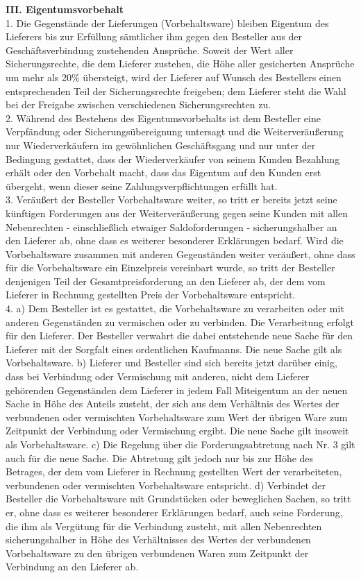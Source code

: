 \begin{multicols}{2}
\begin{scriptsize}
	\textbf{III. Eigentumsvorbehalt}\\
	1. Die Gegenstände der Lieferungen (Vorbehaltsware) bleiben Eigentum des Lieferers bis zur Erfüllung sämtlicher ihm gegen den Besteller aus der Geschäftsverbindung zustehenden Ansprüche. Soweit der Wert aller Sicherungsrechte, die dem Lieferer zustehen, die Höhe aller gesicherten Ansprüche um mehr als 20\% übersteigt, wird der Lieferer auf Wunsch des Bestellers einen entsprechenden Teil der Sicherungsrechte freigeben; dem Lieferer steht die Wahl bei der Freigabe zwischen verschiedenen Sicherungsrechten zu.\\
	2. Während des Bestehens des Eigentumsvorbehalts ist dem Besteller eine Verpfändung oder Sicherungsübereignung untersagt und die Weiterveräußerung nur Wiederverkäufern im gewöhnlichen Geschäftsgang und nur unter der Bedingung gestattet, dass der Wiederverkäufer von seinem Kunden Bezahlung erhält oder den Vorbehalt macht, dass das Eigentum auf den Kunden erst übergeht, wenn dieser seine Zahlungsverpflichtungen erfüllt hat.\\
	3. Veräußert der Besteller Vorbehaltsware weiter, so tritt er bereits jetzt seine künftigen Forderungen aus der Weiterveräußerung gegen seine Kunden mit allen Nebenrechten - einschließlich etwaiger Saldoforderungen - sicherungshalber an den Lieferer ab, ohne dass es weiterer besonderer Erklärungen bedarf. Wird die Vorbehaltsware zusammen mit anderen Gegenständen weiter veräußert, ohne dass für die Vorbehaltsware ein Einzelpreis vereinbart wurde, so tritt der Besteller denjenigen Teil der Gesamtpreisforderung an den Lieferer ab, der dem vom Lieferer in Rechnung gestellten Preis der Vorbehaltsware entspricht.\\
	4. a) Dem Besteller ist es gestattet, die Vorbehaltsware zu verarbeiten oder mit anderen Gegenständen zu vermischen oder zu verbinden. Die Verarbeitung erfolgt für den Lieferer. Der Besteller verwahrt die dabei entstehende neue Sache für den Lieferer mit der Sorgfalt eines ordentlichen Kaufmanns. Die neue Sache gilt als Vorbehaltsware. b) Lieferer und Besteller sind sich bereits jetzt darüber einig, dass bei Verbindung oder Vermischung mit anderen, nicht dem Lieferer gehörenden Gegenständen dem Lieferer in jedem Fall Miteigentum an der neuen Sache in Höhe des Anteils zusteht, der sich aus dem Verhältnis des Wertes der verbundenen oder vermischten Vorbehaltsware zum Wert der übrigen Ware zum Zeitpunkt der Verbindung oder Vermischung ergibt. Die neue Sache gilt insoweit als Vorbehaltsware. c) Die Regelung über die Forderungsabtretung nach Nr. 3 gilt auch für die neue Sache. Die Abtretung gilt jedoch nur bis zur Höhe des Betrages, der dem vom Lieferer in Rechnung gestellten Wert der verarbeiteten, verbundenen oder vermischten Vorbehaltsware entspricht. d) Verbindet der Besteller die Vorbehaltsware mit Grundstücken oder beweglichen Sachen, so tritt er, ohne dass es weiterer besonderer Erklärungen bedarf, auch seine Forderung, die ihm als Vergütung für die Verbindung zusteht, mit allen Nebenrechten sicherungshalber in Höhe des Verhältnisses des Wertes der verbundenen Vorbehaltsware zu den übrigen verbundenen Waren zum Zeitpunkt der Verbindung an den Lieferer ab.\\

\end{scriptsize}
\end{multicols}
